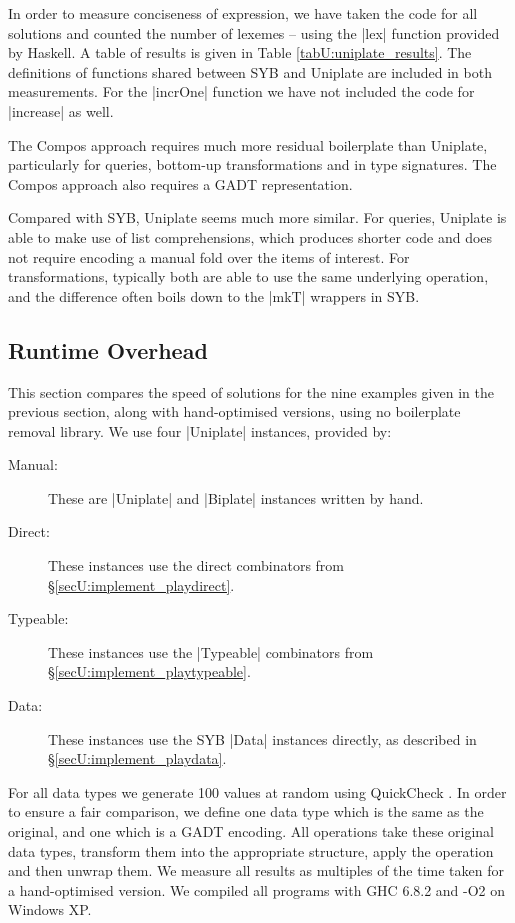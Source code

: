 In order to measure conciseness of expression, we have taken the code for all solutions and counted the number of lexemes -- using the |lex| function provided by Haskell. A table of results is given in Table \ref{tabU:uniplate_results}. The definitions of functions shared between SYB and Uniplate are included in both measurements. For the |incrOne| function we have not included the code for |increase| as well.

The Compos approach requires much more residual boilerplate than Uniplate, particularly for queries, bottom-up transformations and in type signatures. The Compos approach also requires a GADT representation.

Compared with SYB, Uniplate seems much more similar. For queries, Uniplate is able to make use of list comprehensions, which produces shorter code and does not require encoding a manual fold over the items of interest. For transformations, typically both are able to use the same underlying operation, and the difference often boils down to the |mkT| wrappers in SYB.


\subsection{Runtime Overhead}
\label{secU:results_speed}

This section compares the speed of solutions for the nine examples given in the previous section, along with hand-optimised versions, using no boilerplate removal library. We use four |Uniplate| instances, provided by:

\begin{description}
\item[Manual:] These are |Uniplate| and |Biplate| instances written by hand.
\item[Direct:] These instances use the direct combinators from \S\ref{secU:implement_playdirect}.
\item[Typeable:] These instances use the |Typeable| combinators from \S\ref{secU:implement_playtypeable}.
\item[Data:] These instances use the SYB |Data| instances directly, as described in \S\ref{secU:implement_playdata}.
\end{description}

For all data types we generate 100 values at random using QuickCheck \citep{quickcheck}. In order to ensure a fair comparison, we define one data type which is the same as the original, and one which is a GADT encoding. All operations take these original data types, transform them into the appropriate structure, apply the operation and then unwrap them. We measure all results as multiples of the time taken for a hand-optimised version. We compiled all programs with GHC 6.8.2 and -O2 on Windows XP.

